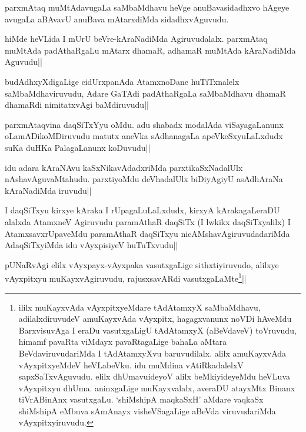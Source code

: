 \begin{artha}%
parxmAtaq muMtAdavugaLa saMbaMdhavu heVge anuBavasidadhxvo hAgeye avugaLa aBAvavU anuBava mAtarxdiMda sidadhxvAguvudu.
\end{artha}

\begin{artha}
hiMde heVLida I mUrU beVre-kAraNadiMda Agiruvudalalx. parxmAtaq muMtAda padAthaRgaLu mAtarx dhamaR, adhamaR muMtAda kAraNadiMda Aguvudu||
\end{artha}

\begin{artha}
budAdhxyXdigaLige cidUrxpanAda AtamxnoDane huTiTxnalelx saMbaMdhaviruvudu, Adare GaTAdi padAthaRgaLa saMbaMdhavu dhamaR dhamaRdi nimitatxvAgi baMdiruvudu||
\end{artha}


\begin{artha}
parxmAtaqvina daqSiTxYyu oMdu. adu shabadx modalAda viSayagaLanunx oLamADikoMDiruvudu matutx aneVka sAdhanagaLa apeVkeSxyuLaLxdudx suKa duHKa PalagaLanunx koDuvudu||
\end{artha}

\begin{artha}
idu adara kAraNAvu kaSxNikavAdadxriMda parxtikaSxNadalUlx nAshavAguvaMtahudu. parxtiyoMdu deVhadalUlx biDiyAgiyU asAdhAraNa kAraNadiMda iruvudu||
\end{artha}%

\begin{artha}
I daqSiTxyu kirxye kAraka I rUpagaLuLaLxdudx, kirxyA kArakagaLeraDU alalxda AtamxneV Agiruvudu paramAthaR daqSiTx (I lwkikx daqSiTxyalilx) I AtamxsavxrUpaveMdu paramAthaR daqSiTxyu nicAMshavAgiruvudadariMda AdaqSiTxyiMda idu vAyxpisiyeV huTuTxvudu||
\end{artha}


\begin{artha}
pUNaRvAgi elilx vAyxpayx-vAyxpaka vasutxgaLige sithxtiyiruvudo, alilxye vAyxpitxyu muKayxvAgiruvudu, rajusxsavARdi vasutxgaLaMte\footnote[1]{ililx muKayxvAda vAyxpitxyeMdare tAdAtamxyX saMbaMdhavu, adilalxdiruvudeV amuKayxvAda vAyxpitx, hagagxvanunx noVDi hAveMdu BarxvisuvAga I eraDu vasutxgaLigU tAdAtamxyX (aBeVdaveV) toVruvudu, himamf pavaRta viMdayx pavaRtagaLige bahaLa aMtara BeVdaviruvudariMda I tAdAtamxyXvu baruvudilalx. alilx amuKayxvAda vAyxpitxyeMdeV heVLabeVku. idu muMdina vAtiRkadalelxV sapxSaTxvAguvudu. elilx dhUmavuideyoV alilx beMkiyideyeMdu heVLuva vAyxpitxyu dhUma. aninxgaLige muKayxvalalx, averaDU atayxMtx Binanx tiVrABinAnx vasutxgaLu. `shiMshipA maqkaSxH' aMdare vaqkaSx shiMshipA eMbuva sAmAnayx visheVSagaLige aBeVda viruvudariMda vAyxpitxyiruvudu.}||
\end{artha}


